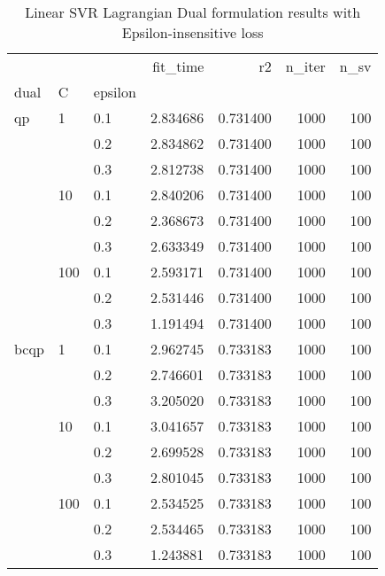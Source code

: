 \begin{table}[H]
\centering
\caption{Linear SVR Lagrangian Dual formulation results with Epsilon-insensitive loss}
\label{linear_lagrangian_dual_svr_cv_results}
\begin{tabular}{lllrrrr}
\toprule
     &     &     &  fit\_time &        r2 &  n\_iter &  n\_sv \\
dual & C & epsilon &           &           &         &       \\
\midrule
qp & 1   & 0.1 &  2.834686 &  0.731400 &    1000 &   100 \\
     &     & 0.2 &  2.834862 &  0.731400 &    1000 &   100 \\
     &     & 0.3 &  2.812738 &  0.731400 &    1000 &   100 \\
     & 10  & 0.1 &  2.840206 &  0.731400 &    1000 &   100 \\
     &     & 0.2 &  2.368673 &  0.731400 &    1000 &   100 \\
     &     & 0.3 &  2.633349 &  0.731400 &    1000 &   100 \\
     & 100 & 0.1 &  2.593171 &  0.731400 &    1000 &   100 \\
     &     & 0.2 &  2.531446 &  0.731400 &    1000 &   100 \\
     &     & 0.3 &  1.191494 &  0.731400 &    1000 &   100 \\
bcqp & 1   & 0.1 &  2.962745 &  0.733183 &    1000 &   100 \\
     &     & 0.2 &  2.746601 &  0.733183 &    1000 &   100 \\
     &     & 0.3 &  3.205020 &  0.733183 &    1000 &   100 \\
     & 10  & 0.1 &  3.041657 &  0.733183 &    1000 &   100 \\
     &     & 0.2 &  2.699528 &  0.733183 &    1000 &   100 \\
     &     & 0.3 &  2.801045 &  0.733183 &    1000 &   100 \\
     & 100 & 0.1 &  2.534525 &  0.733183 &    1000 &   100 \\
     &     & 0.2 &  2.534465 &  0.733183 &    1000 &   100 \\
     &     & 0.3 &  1.243881 &  0.733183 &    1000 &   100 \\
\bottomrule
\end{tabular}
\end{table}
